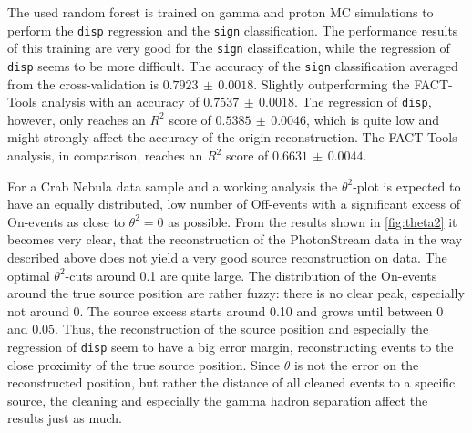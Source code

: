 The used random forest is trained on gamma and proton MC simulations to perform
the \texttt{disp} regression and the \texttt{sign} classification. The
performance results of this training are very good for the \texttt{sign}
classification, while the regression of \texttt{disp} seems to be more
difficult. The accuracy of the \texttt{sign} classification averaged from the
cross-validation is $0.7923\,\pm\,0.0018$. Slightly outperforming the FACT-
Tools analysis with an accuracy of $0.7537\,\pm\,0.0018$. The regression of
\texttt{disp}, however, only reaches an $R^2$ score of $0.5385\,\pm\,0.0046$,
which is quite low and might strongly affect the accuracy of the origin
reconstruction. The FACT-Tools analysis, in comparison, reaches an $R^2$ score
of $0.6631\,\pm\,0.0044$.

For a Crab Nebula data sample and a working analysis the $\theta^2$-plot is
expected to have an equally distributed, low number of Off-events with a
significant excess of On-events as close to $\theta^2 = 0$ as possible. From
the results shown in \autoref{fig:theta2} it becomes very clear, that the
reconstruction of the PhotonStream data in the way described above does not
yield a very good source reconstruction on data. The optimal $\theta^2$-cuts
around \num{0.1} are quite large. The distribution of the On-events around the
true source position are rather fuzzy: there is no clear peak, especially not
around \num{0}. The source excess starts around \num{0.10} and grows until
between \num{0} and \num{0.05}. Thus, the reconstruction of the source position
and especially the regression of \texttt{disp} seem to have a big error margin,
reconstructing events to the close proximity of the true source position. Since
$\theta$ is not the error on the reconstructed position, but rather the
distance of all cleaned events to a specific source, the cleaning and
especially the gamma hadron separation affect the results just as much.
%
